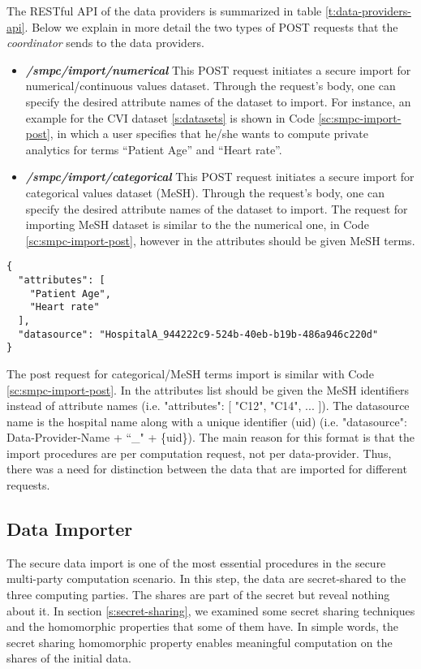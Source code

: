 The RESTful API of the data providers is summarized in table \ref{t:data-providers-api}.
Below we explain in more detail the two types of POST requests that the \textit{coordinator} sends to the data providers.

\begin{itemize}
\item \textbf{\textit{/smpc/import/numerical}}
This POST request initiates a secure import for numerical/continuous values dataset.
Through the request's body, one can specify the desired attribute names of the dataset to import.
For instance, an example for the CVI dataset \ref{s:datasets} is shown in Code \ref{sc:smpc-import-post}, in which a user specifies that he/she wants to compute private analytics for terms ``Patient Age'' and ``Heart rate''.

\item \textbf{\textit{/smpc/import/categorical}}
This POST request initiates a secure import for categorical values dataset (MeSH).
Through the request's body, one can specify the desired attribute names of the dataset to import.
The request for importing MeSH dataset is similar to the the numerical one, in Code \ref{sc:smpc-import-post}, however in the attributes should be given MeSH terms.

\end{itemize}

{
\begin{verbatim}
{
  "attributes": [
    "Patient Age",
    "Heart rate"
  ],
  "datasource": "HospitalA_944222c9-524b-40eb-b19b-486a946c220d"
}
\end{verbatim}
\label{sc:smpc-import-post}
}

The post request for categorical/MeSH terms import is similar with Code \ref{sc:smpc-import-post}.
In the attributes list should be given the MeSH identifiers instead of attribute names (i.e. "attributes": [ "C12", "C14", ... ]).
The datasource name is the hospital name along with a unique identifier (uid) (i.e. "datasource": Data-Provider-Name + ``\_" + \{uid\}).
The main reason for this format is that the import procedures are per computation request, not per data-provider.
Thus, there was a need for distinction between the data that are imported for different requests.

 
\subsection{Data Importer}\label{ss:data-providers-importer}
The secure data import is one of the most essential procedures in the secure multi-party computation scenario.
In this step, the data are secret-shared to the three computing parties.
The shares are part of the secret but reveal nothing about it.
In section \ref{s:secret-sharing}, we examined some secret sharing techniques and the homomorphic properties that some of them have.
In simple words, the secret sharing homomorphic property enables meaningful computation on the shares of the initial data.

